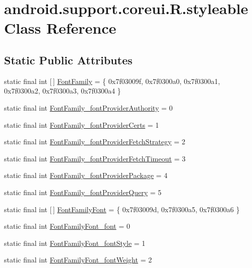 \hypertarget{classandroid_1_1support_1_1coreui_1_1R_1_1styleable}{}\section{android.\+support.\+coreui.\+R.\+styleable Class Reference}
\label{classandroid_1_1support_1_1coreui_1_1R_1_1styleable}
\subsection*{Static Public Attributes}
\begin{DoxyCompactItemize}
\item 
static final int \mbox{[}$\,$\mbox{]} \mbox{\hyperlink{classandroid_1_1support_1_1coreui_1_1R_1_1styleable_a0a981fe231da1760c37fda0677e4e29e}{Font\+Family}} = \{ 0x7f03009f, 0x7f0300a0, 0x7f0300a1, 0x7f0300a2, 0x7f0300a3, 0x7f0300a4 \}
\item 
static final int \mbox{\hyperlink{classandroid_1_1support_1_1coreui_1_1R_1_1styleable_a00715c4a947d460d9361e2f299838915}{Font\+Family\+\_\+font\+Provider\+Authority}} = 0
\item 
static final int \mbox{\hyperlink{classandroid_1_1support_1_1coreui_1_1R_1_1styleable_aa837fc073d36db136b91cdd7b0f6e582}{Font\+Family\+\_\+font\+Provider\+Certs}} = 1
\item 
static final int \mbox{\hyperlink{classandroid_1_1support_1_1coreui_1_1R_1_1styleable_a864d5446f3e9cebbff737bf0cdc3baa2}{Font\+Family\+\_\+font\+Provider\+Fetch\+Strategy}} = 2
\item 
static final int \mbox{\hyperlink{classandroid_1_1support_1_1coreui_1_1R_1_1styleable_abafe5523844d1480a76e91c630383cd4}{Font\+Family\+\_\+font\+Provider\+Fetch\+Timeout}} = 3
\item 
static final int \mbox{\hyperlink{classandroid_1_1support_1_1coreui_1_1R_1_1styleable_a03acbb95803848a33103f66cc12b4f98}{Font\+Family\+\_\+font\+Provider\+Package}} = 4
\item 
static final int \mbox{\hyperlink{classandroid_1_1support_1_1coreui_1_1R_1_1styleable_aa014bc6506c2e66cb1ac0b33c3c8bbbc}{Font\+Family\+\_\+font\+Provider\+Query}} = 5
\item 
static final int \mbox{[}$\,$\mbox{]} \mbox{\hyperlink{classandroid_1_1support_1_1coreui_1_1R_1_1styleable_a09e7beadaea835cfa141e2895096c743}{Font\+Family\+Font}} = \{ 0x7f03009d, 0x7f0300a5, 0x7f0300a6 \}
\item 
static final int \mbox{\hyperlink{classandroid_1_1support_1_1coreui_1_1R_1_1styleable_ae407c9950ba5dc2011b917f0293d8305}{Font\+Family\+Font\+\_\+font}} = 0
\item 
static final int \mbox{\hyperlink{classandroid_1_1support_1_1coreui_1_1R_1_1styleable_ad00501b057920e2245914a87490ce333}{Font\+Family\+Font\+\_\+font\+Style}} = 1
\item 
static final int \mbox{\hyperlink{classandroid_1_1support_1_1coreui_1_1R_1_1styleable_ab902fae1b15d37a55f927de5a8914a7e}{Font\+Family\+Font\+\_\+font\+Weight}} = 2
\end{DoxyCompactItemize}


